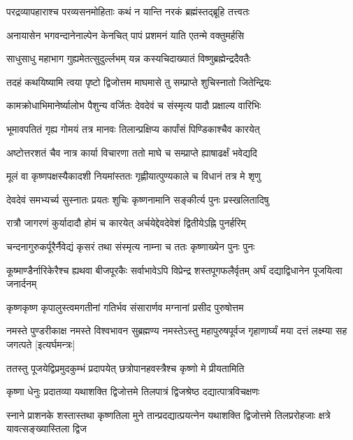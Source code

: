 \twolineshloka
{परद्रव्यापहाराश्च परव्यसनमोहिताः}
{कथं न यान्ति नरकं ब्रह्मंस्तद्ब्रूहि तत्त्वतः}%

\twolineshloka
{अनायासेन भगवन्दानेनाल्पेन केनचित्}
{पापं प्रशमनं याति एतन्मे वक्तुमर्हसि}%


\twolineshloka
{साधुसाधु महाभाग गुह्यमेतत्सुदुर्ल्लभम्}
{यन्न कस्यचिदाख्यातं विष्णुब्रह्मेन्द्रदैवतैः}%

\twolineshloka
{तदहं कथयिष्यामि त्वया पृष्टो द्विजोत्तम}
{माघमासे तु सम्प्राप्ते शुचिस्नातो जितेन्द्रियः}%

\twolineshloka
{कामक्रोधाभिमानेर्ष्यालोभ पैशुन्य वर्जितः}
{देवदेवं च संस्मृत्य पादौ प्रक्षाल्य वारिभिः}%

\twolineshloka
{भूमावपतितं गृह्य गोमयं तत्र मानवः}
{तिलान्प्रक्षिप्य कार्पांसं पिण्डिकाश्चैव कारयेत्}%

\twolineshloka
{अष्टोत्तरशतं चैव नात्र कार्या विचारणा}
{ततो माघे च सम्प्राप्ते ह्याषाढर्क्षं भवेद्यदि}%

\twolineshloka
{मूलं वा कृष्णपक्षस्यैकादशी नियमांस्ततः}
{गृह्णीयात्पुण्यकाले च विधानं तत्र मे शृणु}%

\twolineshloka
{देवदेवं समभ्यर्च्य सुस्नातः प्रयतः शुचिः}
{कृष्णनामानि सङ्कीर्त्य पुनः प्रस्खलितादिषु}%

\twolineshloka
{रात्रौ जागरणं कुर्यादादौ होमं च कारयेत्}
{अर्चयेद्देवदेवेशं द्वितीयेऽह्नि पुनर्हरिम्}%

\twolineshloka
{चन्दनागुरुकर्पूरैर्नैवेद्यं कृसरं तथा}
{संस्मृत्य नाम्ना च ततः कृष्णाख्येन पुनः पुनः}%

\threelineshloka
{कूष्माण्डैर्नारिकेरैश्च ह्यथवा बीजपूरकैः}
{सर्वाभावेऽपि विप्रेन्द्र शस्तपूगफलैर्वृतम्}
{अर्घं दद्याद्विधानेन पूजयित्वा जनार्दनम्}%

\twolineshloka
{कृष्णकृष्ण कृपालुस्त्वमगतीनां गतिर्भव}
{संसारार्णव मग्नानां प्रसीद पुरुषोत्तम}%

\threelineshloka
{नमस्ते पुण्डरीकाक्ष नमस्ते विश्वभावन}
{सुब्रह्मण्य नमस्तेऽस्तु महापुरुषपूर्वज}
{गृहाणार्घ्यं मया दत्तं लक्ष्म्या सह जगत्पते}%
[इत्यर्घमन्त्रः]

\twolineshloka
{ततस्तु पूजयेद्विप्रमुदकुम्भं प्रदापयेत्}
{छत्रोपानहवस्त्रैश्च कृष्णो मे प्रीयतामिति}%

\twolineshloka
{कृष्णा धेनुः प्रदातव्या यथाशक्ति द्विजोत्तमे}
{तिलपात्रं द्विजश्रेष्ठ दद्यात्पात्रविचक्षणः}%

\threelineshloka
{स्नाने प्राशनके शस्तास्तथा कृष्णतिला मुने}
{तान्प्रदद्यात्प्रयत्नेन यथाशक्ति द्विजोत्तमे}
{तिलप्ररोहजाः क्षत्रे यावत्सङ्ख्यास्तिला द्विज}%

